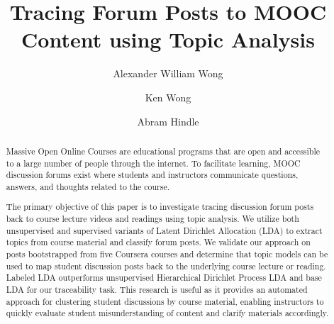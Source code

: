 \documentclass[sigconf, nonacm=true]{acmart}
\begin{document}
%
\title{Tracing Forum Posts to MOOC Content using Topic Analysis} %

%
\author{Alexander William Wong}

\author{Ken Wong}

\author{Abram Hindle}

%

\begin{abstract}
Massive Open Online Courses are educational programs that are open and accessible to a large number of people through the internet.
To facilitate learning, MOOC discussion forums exist where students and instructors communicate questions, answers, and thoughts related to the course.

The primary objective of this paper is to investigate tracing discussion forum posts back to course lecture videos and readings using topic analysis.
We utilize both unsupervised and supervised variants of Latent Dirichlet Allocation (LDA) to extract topics from course material and classify forum posts.
We validate our approach on posts bootstrapped from five Coursera courses and determine that topic models can be used to map student discussion posts back to the underlying course lecture or reading.
Labeled LDA outperforms unsupervised Hierarchical Dirichlet Process LDA and base LDA for our traceability task.
This research is useful as it provides an automated approach for clustering student discussions by course material, enabling instructors to quickly evaluate student misunderstanding of content and clarify materials accordingly.

\end{abstract}
\end{document}
